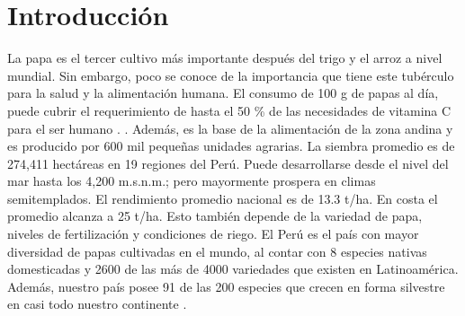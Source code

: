 \documentclass[fleqn,10pt]{Flavio}\usepackage[]{graphicx}\usepackage[]{color}
\affiliation{\textsuperscript{1}\textit{Departamento de Fitot\'ecnia, Universidad Nacional Agraria la Molina, Lima, Per\'u}} %
\affiliation{*\textbf{Correspondencia}: F.lozano@outlook.com} %
\begin{document}
\flushbottom %
\maketitle %


\section*{Introducci\'on} %

La papa es el tercer cultivo m\'as importante despu\'es del trigo y el arroz a nivel mundial. Sin embargo, poco se conoce de la importancia que tiene este tub\'erculo para la salud y la alimentaci\'on humana. El consumo de 100 g de papas al d\'ia,  puede cubrir el requerimiento de hasta el 50 \% de las necesidades de vitamina C para el ser humano \citep{INIAP18/06/14}. . Adem\'as, es la base de la alimentaci\'on de la zona andina y es producido por 600 mil peque\~nas unidades agrarias. La siembra promedio es de 274,411 hect\'areas en 19 regiones del Per\'u. Puede desarrollarse desde el nivel del mar hasta los 4,200 m.s.n.m.; pero mayormente prospera en climas semitemplados. El rendimiento promedio nacional es de 13.3 t/ha. En costa el promedio alcanza a 25 t/ha. Esto tambi\'en depende de la variedad de papa, niveles de fertilizaci\'on y condiciones de riego. El Per\'u es el pa\'is con mayor diversidad de papas cultivadas en el mundo, al contar con 8 especies nativas domesticadas y 2600 de las m\'as de 4000 variedades que existen en Latinoam\'erica. Adem\'as, nuestro pa\'is posee 91 de las 200 especies que crecen en forma silvestre en casi todo nuestro continente \citep{MINAG18/06/14}. 
\end{document}
